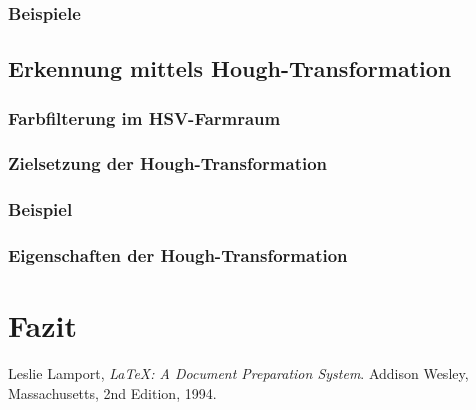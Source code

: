 \documentclass[a4paper,12pt]{article}
\begin{document}
\subsubsection{Beispiele}

\subsection{Erkennung mittels Hough-Transformation}
\subsubsection{Farbfilterung im HSV-Farmraum}
\subsubsection{Zielsetzung der Hough-Transformation}
\subsubsection{Beispiel}
\subsubsection{Eigenschaften der Hough-Transformation}

\section{Fazit}


\begin{thebibliography}{9}

  Leslie Lamport,
  \emph{\LaTeX: A Document Preparation System}.
  Addison Wesley, Massachusetts,
  2nd Edition,
  1994.

\end{thebibliography}
\end{document}
